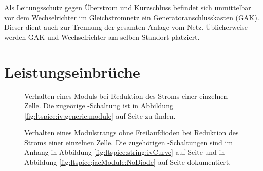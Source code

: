 Als Leitungsschutz gegen \"Uberstrom und Kurzschluss befindet sich unmittelbar
vor  dem   Wechselrichter  im  Gleichstromnetz   ein  Generatoranschlusskasten
(GAK). Dieser   dient   auch   zur    Trennung   der   gesamten   Anlage   vom
Netz. \"Ublicherweise  werden  GAK  und   Wechselrichter  am  selben  Standort
platziert.


\clearpage
\section{Leistungseinbr\"uche}
\label{sec:shadedCells}


\begin{figure}[h!tb]
    
    
    \caption[IV- und PV-Kurven eines PV-Moduls bei Leistungseinbruch]{%
        Verhalten   eines    Moduls   bei    Reduktion   des    Stroms   einer
        einzelnen   Zelle.   Die   zuge\"orige  -Schaltung   ist
        in    Abbildung    \ref{fig:ltspice:iv:generic:module}    auf    Seite
        \pageref{fig:ltspice:iv:generic:module} zu finden.%
    }
    \label{fig:simu:iv-curves:module:generic}
\end{figure}

\begin{figure}[h!tb]
    
    \caption[%
        IV- und PV-Kurven eines Modulsstrangs bei Leistungseinbruch,
        keine Freilaufdioden%
    ]
    {%
        Verhalten       eines      Modulstrangs       ohne      Freilaufdioden
        bei     Reduktion     des     Stroms    einer     einzelnen     Zelle.
        Die      zugeh\"origen     -Schaltungen      sind     im
        Anhang       in       Abbildung       \ref{fig:ltspice:string:ivCurve}
        auf     Seite      \pageref{fig:ltspice:string:ivCurve}     und     in
        Abbildung      \ref{fig:ltspice:jacModule:NoDiode}      auf      Seite
        \pageref{fig:ltspice:jacModule:NoDiode} dokumentiert.%
    }
    \label{fig:simu:iv-curves:array:generic}
\end{figure}

